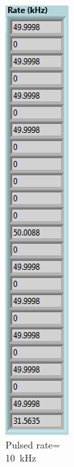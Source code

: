 \begin{figure}[H]
\begin{minipage}{0.24\textwidth}
		\caption{Pulsed rate=\\10~kHz}
		\label{fig:10khz}
	\end{minipage}
	\begin{minipage}{0.24\textwidth}
		\centering
		\includegraphics[width=.75\linewidth]{IMG/ch5/latch_tests/fig17}

\end{minipage}
\end{figure}
